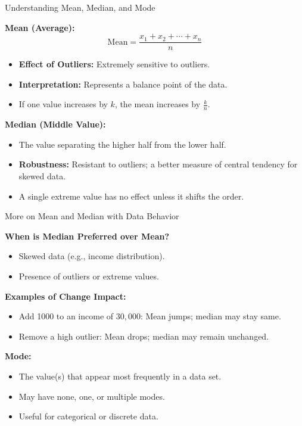 \documentclass{beamer}
\begin{document}
\begin{frame}{Understanding Mean, Median, and Mode}
\small

\textbf{Mean (Average):}  
\[
\text{Mean} = \frac{x_1 + x_2 + \cdots + x_n}{n}
\]
\begin{itemize}
    \item \textbf{Effect of Outliers:} Extremely sensitive to outliers.
    \item \textbf{Interpretation:} Represents a balance point of the data.
    \item If one value increases by $k$, the mean increases by $\frac{k}{n}$.
\end{itemize}

\vspace{0.3cm}
\textbf{Median (Middle Value):}
\begin{itemize}
    \item The value separating the higher half from the lower half.
    \item \textbf{Robustness:} Resistant to outliers; a better measure of central tendency for skewed data.
    \item A single extreme value has no effect unless it shifts the order.
\end{itemize}

\end{frame}

\begin{frame}{More on Mean and Median with Data Behavior}
\small

\textbf{When is Median Preferred over Mean?}
\begin{itemize}
    \item Skewed data (e.g., income distribution).
    \item Presence of outliers or extreme values.
\end{itemize}

\vspace{0.3cm}
\textbf{Examples of Change Impact:}
\begin{itemize}
    \item Add 1000 to an income of $30,000$: Mean jumps; median may stay same.
    \item Remove a high outlier: Mean drops; median may remain unchanged.
\end{itemize}

\vspace{0.3cm}
\textbf{Mode:}
\begin{itemize}
    \item The value(s) that appear most frequently in a data set.
    \item May have none, one, or multiple modes.
    \item Useful for categorical or discrete data.
\end{itemize}

\end{frame}
\end{document}
